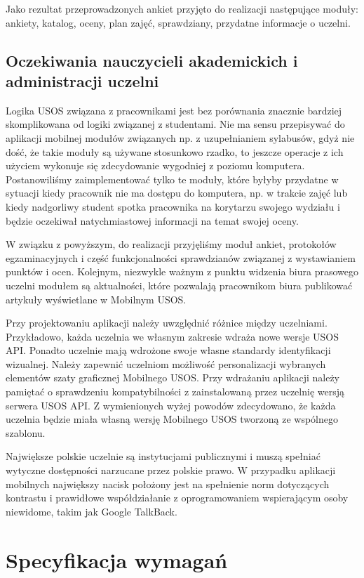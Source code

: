 \documentclass{pracamgr}
\begin{document}
Jako rezultat przeprowadzonych ankiet przyjęto do realizacji następujące moduły:
ankiety, katalog, oceny, plan zajęć, sprawdziany, przydatne informacje o uczelni.

\section{Oczekiwania nauczycieli akademickich i administracji uczelni}

Logika USOS związana z pracownikami jest bez porównania znacznie bardziej
skomplikowana od logiki związanej z studentami. Nie ma sensu przepisywać do
aplikacji mobilnej modułów związanych np. z uzupełnianiem sylabusów, gdyż
nie dość, że takie moduły są używane stosunkowo rzadko, to jeszcze operacje
z ich użyciem wykonuje się zdecydowanie wygodniej z poziomu komputera. Postanowiliśmy
zaimplementować tylko te moduły, które byłyby przydatne w sytuacji kiedy pracownik
nie ma dostępu do komputera, np. w trakcie zajęć lub kiedy nadgorliwy student
spotka pracownika na korytarzu swojego wydziału i będzie oczekiwał natychmiastowej
informacji na temat swojej oceny.

W związku z powyższym, do realizacji przyjęliśmy moduł ankiet, protokołów
egzaminacyjnych i część funkcjonalności sprawdzianów związanej z wystawianiem
punktów i ocen. Kolejnym, niezwykle ważnym z punktu widzenia biura prasowego uczelni
modułem są aktualności, które pozwalają pracownikom biura publikować artykuły
wyświetlane w Mobilnym USOS.

Przy projektowaniu aplikacji należy uwzględnić różnice między uczelniami.
Przykładowo, każda uczelnia we własnym zakresie wdraża nowe wersje USOS API.
Ponadto uczelnie mają wdrożone swoje własne standardy identyfikacji wizualnej.
Należy zapewnić uczelniom możliwość personalizacji wybranych elementów szaty
graficznej Mobilnego USOS. Przy wdrażaniu aplikacji należy pamiętać o
sprawdzeniu kompatybilności z zainstalowaną przez uczelnię wersją serwera USOS API.
Z wymienionych wyżej powodów zdecydowano, że każda uczelnia będzie miała własną
wersję Mobilnego USOS tworzoną ze wspólnego szablonu.

Największe polskie uczelnie są instytucjami publicznymi i muszą spełniać wytyczne
dostępności narzucane przez polskie prawo. W przypadku aplikacji mobilnych
największy nacisk położony jest na spełnienie norm dotyczących kontrastu i prawidłowe
współdziałanie z oprogramowaniem wspierającym osoby niewidome, takim jak Google
TalkBack.

\chapter{Specyfikacja wymagań}
\end{document}
